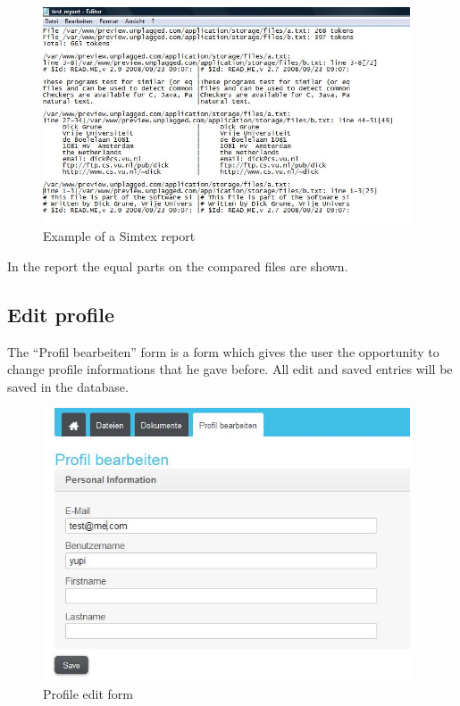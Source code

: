 \begin{figure}[!ht]
  \centering
    \includegraphics[width=0.97\textwidth]{images/basic_functionalities/simtext_report.jpg}
  \caption{Example of a Simtex report}
  \label{fig:e.g. simtex report}
\end{figure}

In the report the equal parts on the compared files are shown.

\subsection{Edit profile}

The \enquote{Profil bearbeiten} form is a form which gives the user the opportunity to change profile informations that 
he gave before. All edit and saved entries will be saved in the database.

\begin{figure}[!ht]
  \centering
    \includegraphics[width=0.97\textwidth]{images/basic_functionalities/edit_profile.jpg}
  \caption{Profile edit form}
  \label{fig: profile edit form}
\end{figure}

